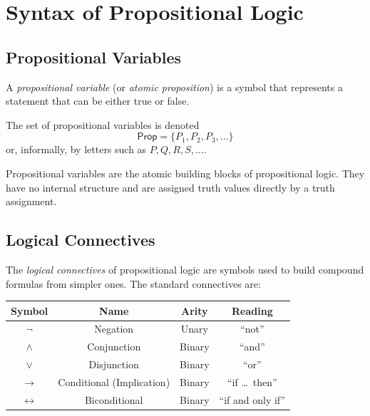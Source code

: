 
\section{Syntax of Propositional Logic}

\subsection{Propositional Variables}

\begin{definition}
A \emph{propositional variable} (or \emph{atomic proposition}) is a symbol that
represents a statement that can be either true or false.

The set of propositional variables is denoted
\[
\mathsf{Prop} = \{P_1, P_2, P_3, \dots\}
\]
or, informally, by letters such as $P, Q, R, S, \dots$.
\end{definition}

\begin{remark}
Propositional variables are the atomic building blocks of propositional logic.
They have no internal structure and are assigned truth values directly by a
truth assignment.
\end{remark}

\subsection{Logical Connectives}

\begin{definition}
The \emph{logical connectives} of propositional logic are symbols used to build
compound formulas from simpler ones. The standard connectives are:

\begin{center}
\renewcommand{\arraystretch}{1.3}
\begin{tabular}{|c|c|c|c|}
\hline
\textbf{Symbol} & \textbf{Name} & \textbf{Arity} & \textbf{Reading} \\
\hline
$\neg$ & Negation & Unary & ``not'' \\
$\wedge$ & Conjunction & Binary & ``and'' \\
$\vee$ & Disjunction & Binary & ``or'' \\
$\rightarrow$ & Conditional (Implication) & Binary & ``if \dots\ then'' \\
$\leftrightarrow$ & Biconditional & Binary & ``if and only if'' \\
\hline
\end{tabular}
\end{center}
\end{definition}

